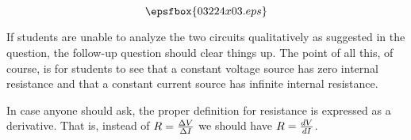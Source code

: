 $$\epsfbox{03224x03.eps}$$







If students are unable to analyze the two circuits qualitatively as suggested in the question, the follow-up question should clear things up.  The point of all this, of course, is for students to see that a constant voltage source has zero internal resistance and that a constant current source has infinite internal resistance.

In case anyone should ask, the proper definition for resistance is expressed as a derivative.  That is, instead of $R = {\Delta V \over \Delta I}$ we should have $R = {dV \over dI}$.




